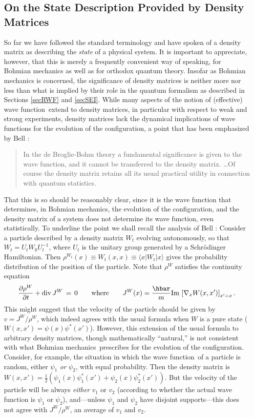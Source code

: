 \documentclass[12pt]{article}
\newcommand{\Sc}{Schr\"{o}dinger}
\newcommand{\BM}{Bohmian mechanics}
\newcommand{\wf}{wave function}
\newcommand{\oqt}{orthodox quantum theory}
\begin{document}
\subsection {On the State Description Provided by Density Matrices} So
far we have followed the standard terminology and have spoken of a
density matrix as describing the {\it state} of a physical system.  It
is important to appreciate, however, that this is merely a frequently
convenient way of speaking, for \BM{} as well as for \oqt{}.  Insofar
as \BM{} is concerned, the significance of density matrices is neither
more nor less than what is implied by their role in the quantum
formalism as described in Sections \ref{secRWF} and \ref{secSEI}.
While many aspects of the notion of (effective) \wf\ extend to density
matrices, in particular with respect to weak and strong experiments,
density matrices lack the dynamical implications of \wf{}s for the
evolution of the configuration, a point that has been emphasized by
Bell \cite{Bel80}:
\begin{quotation}\small\noindent
   In the de Broglie-Bohm theory a fundamental significance is given to
   the wave function, and it cannot be transferred to the density
   matrix.  \ldots Of course the density matrix retains all its usual
   practical utility in connection with quantum statistics.
\end{quotation}
That this is so should be reasonably clear, since it is the \wf{} that
determines, in \BM{}, the evolution of the configuration, and the
density matrix of a system does not determine its \wf{}, even
statistically. To underline the point we shall recall the analysis of
Bell \cite{Bel80}: Consider a particle described by a density matrix
$W_t$ evolving autonomously, so that $W_{t} =U_{t}W_{0}U_{t}^{-1}$,
where $U_{t}$ is the unitary group generated by a \Sc{} Hamiltonian.
Then $ \rho^{W_{t}}(x) \equiv W_{t}(x,x)\equiv \langle x| W_{t}|
x\rangle $ gives the probability distribution of the position of the
particle.  Note that $\rho^{W}$ satisfies the continuity equation
$$
\frac{\partial \rho^W}{\partial t} + \hbox{\rm div}\, J^W
\,=\,0\qquad\mbox{where}\qquad J^{W} (x) = \frac{\hbar}{m}{\rm Im}\,
\left[ \nabla_x W(x,x')\right]_{x'=x}.
$$
This might suggest that the velocity of the particle should be
given by $ v =J^W /\rho^W $, which indeed agrees with the usual
formula when $W$ is a pure state ($W(x,x') = \psi (x) \psi^*(x')$).
However, this extension of the usual formula to arbitrary density
matrices, though mathematically ``natural,'' is not consistent with
what \BM\ prescribes for the evolution of the configuration. Consider,
for example, the situation in which the \wf\ of a particle is random,
either $\psi_1$ {\it or } $\psi_2$, with equal probability.  Then the
density matrix is $ W(x,x') = \frac12\left( \psi_1(x) \psi_1^* (x')+
   \psi_2(x)\psi_2^*(x')\right) $. But the velocity of the particle
will be always {\it either} $v_1$ or $v_2$ (according to whether the
actual \wf{} is $\psi_1$ or $\psi_2$), and---unless $\psi_1$ and
$\psi_2$ have disjoint supports---this does not agree with $J^W /
\rho^W $, an average of $v_1$ and $v_2$.
\end{document}
